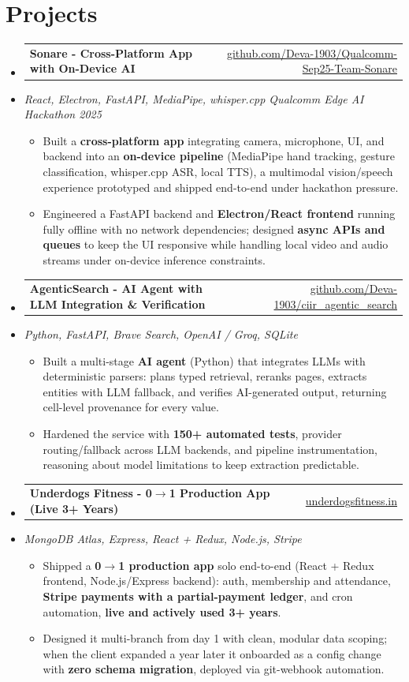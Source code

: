 \documentclass[letterpaper,10pt]{article}
\makeatletter
\newcommand{\resumeItem}[1]{
  \item\small{#1\vspace{-1pt}}
}
\newcommand{\resumeProjectHeading}[2]{
    \item
    \begin{tabular*}{0.985\textwidth}[t]{l@{\extracolsep{\fill}}r}
      \small\textbf{#1} & \small #2 \\
    \end{tabular*}\vspace{-5pt}
}
\newcommand{\resumeProjectSubheading}[1]{
  \vspace{-2pt}\item[] {\small\textcolor{ResumeSlate}{\emph{#1}}}\vspace{-3pt}
}
\newcommand{\resumeSubHeadingListStart}{\begin{itemize}[leftmargin=0.0in, label={}, itemsep=2pt, topsep=2pt]}
\newcommand{\resumeSubHeadingListEnd}{\end{itemize}}
\newcommand{\resumeItemListStart}{\begin{itemize}[leftmargin=0.18in, itemsep=2pt, topsep=1pt]}
\newcommand{\resumeItemListEnd}{\end{itemize}\vspace{-4pt}}
\makeatother
\begin{document}
\section{Projects}
\resumeSubHeadingListStart
  \resumeProjectHeading
    {Sonare - Cross-Platform App with On-Device AI}
    {\href{https://github.com/Deva-1903/Qualcomm-Sep25-Team-Sonare}{github.com/Deva-1903/Qualcomm-Sep25-Team-Sonare}}
  \resumeProjectSubheading{React, Electron, FastAPI, MediaPipe, whisper.cpp \enspace\textbar\enspace Qualcomm Edge AI Hackathon 2025}
    \resumeItemListStart
      \resumeItem{Built a \textbf{cross-platform app} integrating camera, microphone, UI, and backend into an \textbf{on-device pipeline} (MediaPipe hand tracking, gesture classification, whisper.cpp ASR, local TTS), a multimodal vision/speech experience prototyped and shipped end-to-end under hackathon pressure.}
      \resumeItem{Engineered a FastAPI backend and \textbf{Electron/React frontend} running fully offline with no network dependencies; designed \textbf{async APIs and queues} to keep the UI responsive while handling local video and audio streams under on-device inference constraints.}
    \resumeItemListEnd
  \resumeProjectHeading
    {AgenticSearch - AI Agent with LLM Integration \& Verification}
    {\href{https://github.com/Deva-1903/ciir_agentic_search}{github.com/Deva-1903/ciir\_agentic\_search}}
  \resumeProjectSubheading{Python, FastAPI, Brave Search, OpenAI / Groq, SQLite}
    \resumeItemListStart
      \resumeItem{Built a multi-stage \textbf{AI agent} (Python) that integrates LLMs with deterministic parsers: plans typed retrieval, reranks pages, extracts entities with LLM fallback, and verifies AI-generated output, returning cell-level provenance for every value.}
      \resumeItem{Hardened the service with \textbf{150+ automated tests}, provider routing/fallback across LLM backends, and pipeline instrumentation, reasoning about model limitations to keep extraction predictable.}
    \resumeItemListEnd
  \resumeProjectHeading
    {Underdogs Fitness - 0\(\to\)1 Production App (Live 3+ Years)}
    {\href{https://www.underdogsfitness.in/}{underdogsfitness.in}}
  \resumeProjectSubheading{MongoDB Atlas, Express, React + Redux, Node.js, Stripe}
    \resumeItemListStart
      \resumeItem{Shipped a \textbf{0$\to$1 production app} solo end-to-end (React + Redux frontend, Node.js/Express backend): auth, membership and attendance, \textbf{Stripe payments with a partial-payment ledger}, and cron automation, \textbf{live and actively used 3+ years}.}
      \resumeItem{Designed it multi-branch from day 1 with clean, modular data scoping; when the client expanded a year later it onboarded as a config change with \textbf{zero schema migration}, deployed via git-webhook automation.}
    \resumeItemListEnd
\resumeSubHeadingListEnd
\vspace{-4pt}
\end{document}
